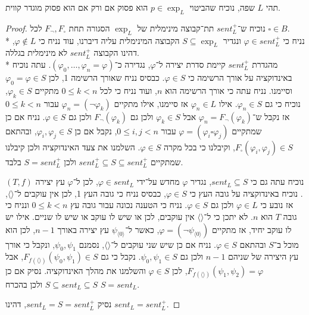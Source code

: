 \Question{}
תהי $L$ שפה, נוכיח שהביטוי $p \in \exp_L$ הוא פסוק אם ורק אם הוא פסוק מוגדר קווית.
\begin{proof}
	נוכיח ש־$sent_L^+$ תת־קבוצה מינימלית של $\exp_L$ הסגורה תחת $F_\lnot, F_\square$ לכל $\square \in B$. \\*
	נניח כי $\varphi \in sent_L^+$ ונגדיר $S \subseteq \exp_L$ הקבוצה המינימלית עליה דיברנו, עוד נניח כי $\varphi \notin L$, דהינו הקבוצה $sent_L^+$ לא מינימלית בגללה. \\*
	מהגדרת $sent_L^+$ קיימת סדרת יצירה ל־$\varphi$, נגדירה כ־$(\varphi_0, \dots, \varphi_n = \varphi)$.
	עתה נוכיח באינדוקציה על אורך הרשימה כי $\varphi \in S$. כבסיס נניח שאורך הרשימה 1, לכן $\varphi_0 = \varphi \in S$ וסיימנו.
	נניח עתה כי אורך הרשימה הוא $n$, ועוד נניח כי לכל $0 \le k < n$ מתקיים $\varphi_k \in S$, נוכיח כי גם $\varphi_n \in S$.
	אילו $\varphi_n \in L$ אז סיימנו, אילו מתקיים $\varphi_n = (\lnot \varphi_k)$ עבור $0 \le k < n$ אז נקבל ש־$\varphi_n = F_\lnot(\varphi_k)$ אבל $\varphi_k \in S$ ולכן גם $F_\lnot(\varphi_k)$ ולכן גם $\varphi \in S$.
	נניח אם כן שמתקיים $\varphi = (\varphi_i \square \varphi_j)$ עבור $0 \le i, j < n$, נקבל אם כן $\varphi_i, \varphi_j \in S$, ובהתאם $F_\square(\varphi_i, \varphi_j) \in S$, וקיבלנו כי בכל מקרה $\varphi \in S$.
	השלמנו את צעד האינדוקציה ולכן קיבלנו שמתקיים $sent_L^+ \subseteq S \subseteq sent_L^+$ ולכן $S = sent_L^+$ בלבד.

	נוכיח עתה גם כי $sent_L \subseteq S$, נגדיר $\varphi$ מחדש על־ידי $\varphi \in sent_L$, לכן ל־$\varphi$ עץ יצירה $(T, f)$.
	נוכיח באינדוקציה על גובה העץ כי $\varphi \in S$, כבסיס נניח כי גובה העץ 1, לכן אין עוקבים ל־$\langle \rangle$, אז נובע כי $\varphi \in L$ ולכן גם $\varphi \in S$.
	נניח כי הטענה נכונה עבור גובה עץ $0 \le k < n$ ונניח כי גובה $T$ הוא $n$. לא יתכן כי ל־$\langle \rangle$ אין עוקבים, לכן או שיש לו עוקב או שיש לו שניים.
	אילו יש לו עוקב יחיד, אז מתקיים $\varphi = (\lnot \psi_{\langle 0 \rangle})$, כאשר ל־$\psi_{\langle 0 \rangle}$ עץ יצירה באורך $n - 1$, לכן הוא מוכל ב־$S$ ובהתאם $\varphi \in S$.
	נניח אם כן שיש שני עוקבים ל־$\langle \rangle$, נסמנם $\psi_0, \psi_1$, ונקבל כי אורך עץ היצירה של שניהם $n - 1$ ולכן גם $\psi_0, \psi_1 \in S$.
	נקבל כי גם $F_{f(\langle \rangle)}(\psi_0, \psi_1) \in S$, אבל $F_{f(\langle \rangle)}(\psi_1, \psi_2) = \varphi$, לכן $\varphi \in S$ והשלמנו את מהלך האינדוקציה.
	נסיק אם כן $S \subseteq sent_L \subseteq S$ ולכן בהכרח $S = sent_L$.

	נסיק $sent_L = S = sent_L^+$, דהינו $sent_L = sent_L^+$.
\end{proof}

